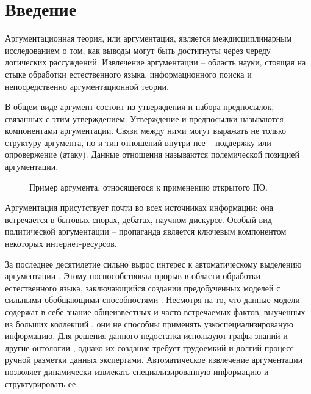 \section{Введение}
\label{sec:Chapter1} 
Аргументационная теория, или аргументация, является междисциплинарным исследованием о том, как выводы могут быть достигнуты через череду логических рассуждений. Извлечение аргументации – область науки, стоящая на стыке обработки естественного языка, информационного поиска и непосредственно аргументационной теории.

В общем виде аргумент состоит из утверждения и набора предпосылок, связанных с этим утверждением. Утверждение и предпосылки называются компонентами аргументации. Связи между ними могут выражать не только структуру аргумента, но и тип отношений внутри нее – поддержку или опровержение (атаку). Данные отношения называются полемической позицией аргументации.
\begin{figure}[H]
 \setcounter{figure}{0}
 \caption{Пример аргумента, относящегося к применению открытого ПО.}
\end{figure}
Аргументация присутствует почти во всех источниках информации: она встречается в бытовых спорах, дебатах, научном дискурсе. Особый вид политической аргументации – пропаганда является ключевым компонентом некоторых интернет-ресурсов.

За последнее десятилетие сильно вырос интерес к автоматическому выделению аргументации \cite{lippi2016argumentation}. Этому поспособствовал прорыв в области обработки естественного языка, заключающийся создании предобученных моделей с сильными обобщающими способностями \cite{mikolov2013efficient, devlin2018bert, radford2019language}. Несмотря на то, что данные модели содержат в себе знание общеизвестных и часто встречаемых фактов, выученных из больших коллекций \cite{petroni2019language}, они не способны применять узкоспециализированую информацию. Для решения данного недостатка используют графы знаний и другие онтологии \cite{sorokin2018modeling, chen2019multi}, однако их создание требует трудоемкий и долгий процесс ручной разметки данных экспертами. Автоматическое извлечение аргументации позволяет динамически извлекать специализированную информацию и структурировать ее.

